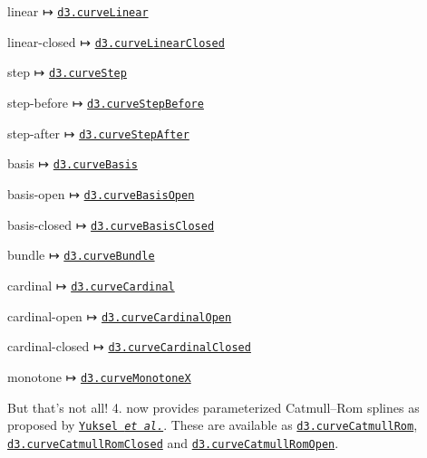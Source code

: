 \begin{DoxyItemize}
\item linear ↦ \href{https://github.com/d3/d3-shape/blob/master/README.md#curveLinear}{\tt d3.\+curve\+Linear}
\item linear-\/closed ↦ \href{https://github.com/d3/d3-shape/blob/master/README.md#curveLinearClosed}{\tt d3.\+curve\+Linear\+Closed}
\item step ↦ \href{https://github.com/d3/d3-shape/blob/master/README.md#curveStep}{\tt d3.\+curve\+Step}
\item step-\/before ↦ \href{https://github.com/d3/d3-shape/blob/master/README.md#curveStepBefore}{\tt d3.\+curve\+Step\+Before}
\item step-\/after ↦ \href{https://github.com/d3/d3-shape/blob/master/README.md#curveStepAfter}{\tt d3.\+curve\+Step\+After}
\item basis ↦ \href{https://github.com/d3/d3-shape/blob/master/README.md#curveBasis}{\tt d3.\+curve\+Basis}
\item basis-\/open ↦ \href{https://github.com/d3/d3-shape/blob/master/README.md#curveBasisOpen}{\tt d3.\+curve\+Basis\+Open}
\item basis-\/closed ↦ \href{https://github.com/d3/d3-shape/blob/master/README.md#curveBasisClosed}{\tt d3.\+curve\+Basis\+Closed}
\item bundle ↦ \href{https://github.com/d3/d3-shape/blob/master/README.md#curveBundle}{\tt d3.\+curve\+Bundle}
\item cardinal ↦ \href{https://github.com/d3/d3-shape/blob/master/README.md#curveCardinal}{\tt d3.\+curve\+Cardinal}
\item cardinal-\/open ↦ \href{https://github.com/d3/d3-shape/blob/master/README.md#curveCardinalOpen}{\tt d3.\+curve\+Cardinal\+Open}
\item cardinal-\/closed ↦ \href{https://github.com/d3/d3-shape/blob/master/README.md#curveCardinalClosed}{\tt d3.\+curve\+Cardinal\+Closed}
\item monotone ↦ \href{https://github.com/d3/d3-shape/blob/master/README.md#curveMonotoneX}{\tt d3.\+curve\+MonotoneX}
\end{DoxyItemize}

But that’s not all! 4. now provides parameterized Catmull–\+Rom splines as proposed by \href{http://www.cemyuksel.com/research/catmullrom_param/}{\tt Yuksel {\itshape et al.}}. These are available as \href{https://github.com/d3/d3-shape/blob/master/README.md#curveCatmullRom}{\tt d3.\+curve\+Catmull\+Rom}, \href{https://github.com/d3/d3-shape/blob/master/README.md#curveCatmullRomClosed}{\tt d3.\+curve\+Catmull\+Rom\+Closed} and \href{https://github.com/d3/d3-shape/blob/master/README.md#curveCatmullRomOpen}{\tt d3.\+curve\+Catmull\+Rom\+Open}.

